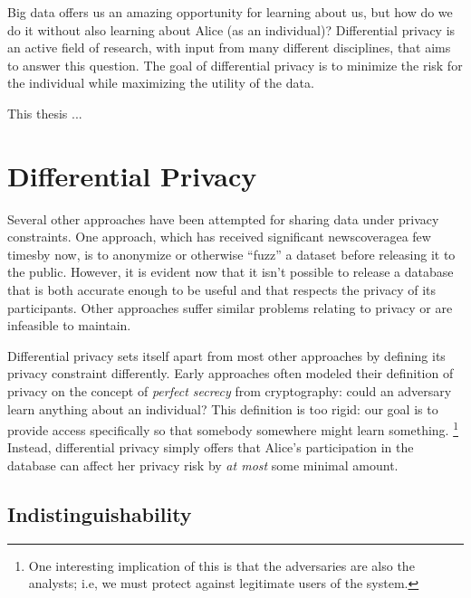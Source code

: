 \documentclass[12pt]{report}
\begin{document}
Big data offers us an amazing opportunity for learning about us, but how do we do it without also learning about Alice (as an individual)?
Differential privacy is an active field of research, with input from many different disciplines, that aims to answer this question\cite{journals/cacm/Dwork11}.
The goal of differential privacy is to minimize the risk for the individual while maximizing the utility of the data.

This thesis ...

\section{Differential Privacy}\label{sec:intro-diffpriv}

Several other approaches have been attempted for sharing data under privacy constraints.
One approach, which has received significant news\footnotemark[\ref{fn:aol}] coverage\footnotemark[\ref{fn:twitter}] a few times\footnotemark[\ref{fn:netflix}] by now\footnotemark[\ref{fn:gic}], is to anonymize or otherwise ``fuzz'' a dataset before releasing it to the public.
However, it is evident now that it isn't possible to release a database that is both accurate enough to be useful and that respects the privacy of its participants.
Other approaches suffer similar problems relating to privacy or are infeasible to maintain\cite{journals/cacm/Dwork11}.

Differential privacy sets itself apart from most other approaches by defining its privacy constraint differently.
Early approaches often modeled their definition of privacy on the concept of \textit{perfect secrecy} from cryptography: could an adversary learn anything about an individual?
This definition is too rigid: our goal is to provide access specifically so that somebody somewhere might learn something.
\footnote{One interesting implication of this is that the adversaries are also the analysts; i.e, we must protect against legitimate users of the system.}
Instead, differential privacy simply offers that Alice's participation in the database can affect her privacy risk by \textit{at most} some minimal amount.


\subsection{Indistinguishability}\label{subsec:intro-indistinguishability}
\end{document}
